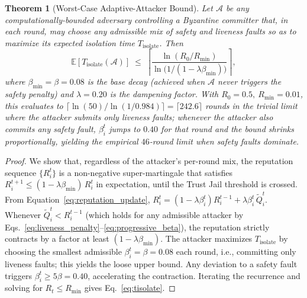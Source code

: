 \documentclass[journal]{IEEEtran}
\newtheorem{theorem}{Theorem}
\begin{document}
\begin{theorem}[Worst-Case Adaptive-Attacker Bound]
\label{thm:adaptive}
Let $\mathcal{A}$ be any computationally-bounded adversary controlling a Byzantine committer that, in each round, may choose any admissible mix of safety and liveness faults so as to maximize its expected isolation time $T_{\mathrm{isolate}}$. Then
\begin{equation}
\mathbb{E}[T_{\mathrm{isolate}}(\mathcal{A})] \;\le\; \left\lceil \frac{\ln(R_0/R_{\min})}{\ln\bigl(1/(1-\lambda\beta_{\min})\bigr)} \right\rceil ,
\label{eq:tisolate}
\end{equation}
where $\beta_{\min}=\beta=0.08$ is the base decay (achieved when $\mathcal{A}$ never triggers the safety penalty) and $\lambda=0.20$ is the dampening factor. With $R_0=0.5,\ R_{\min}=0.01$, this evaluates to $\lceil \ln(50)/\ln(1/0.984) \rceil = \lceil 242.6 \rceil$ rounds in the trivial limit where the attacker submits only liveness faults; whenever the attacker also commits any safety fault, $\beta_i^t$ jumps to $0.40$ for that round and the bound shrinks proportionally, yielding the empirical $46$-round limit when safety faults dominate.
\end{theorem}

\begin{proof}
We show that, regardless of the attacker's per-round mix, the reputation sequence $\{R_i^t\}$ is a non-negative super-martingale that satisfies $R_i^{t+1} \le (1-\lambda\beta_{\min})\,R_i^{t}$ in expectation, until the Trust Jail threshold is crossed. From Equation~\ref{eq:reputation_update}, $R_i^{t} = (1-\lambda\beta_i^t)R_i^{t-1} + \lambda\beta_i^t\,\widetilde{Q}_i^t$. Whenever $\widetilde{Q}_i^t < R_i^{t-1}$ (which holds for any admissible attacker by Eqs.~\ref{eq:liveness_penalty}--\ref{eq:progressive_beta}), the reputation strictly contracts by a factor at least $(1-\lambda\beta_{\min})$. The attacker maximizes $T_{\mathrm{isolate}}$ by choosing the smallest admissible $\beta_i^t = \beta = 0.08$ each round, i.e., committing only liveness faults; this yields the loose upper bound. Any deviation to a safety fault triggers $\beta_i^t \ge 5\beta = 0.40$, accelerating the contraction. Iterating the recurrence and solving for $R_t \le R_{\min}$ gives Eq.~\ref{eq:tisolate}.
\end{proof}
\end{document}

